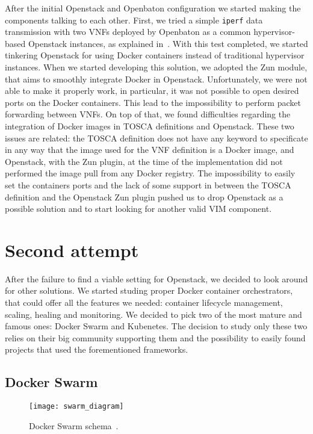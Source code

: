 After the initial Openstack and Openbaton configuration we started making the
components talking to each other. First, we tried a simple \verb!iperf! data
transmission with two VNFs deployed by Openbaton as a common hypervisor-based
Openstack instances, as explained in~\cite{openbatonIperf}. With this test
completed, we started tinkering Openstack for using Docker containers instead of
traditional hypervisor instances. When we started developing this solution, we
adopted the Zun module, that aims to smoothly integrate Docker in Openstack.
Unfortunately, we were not able to make it properly work, in particular, it was
not possible to open desired ports on the Docker containers. This lead to the
impossibility to perform packet forwarding between VNFs. On top of that, we
found difficulties regarding the integration of Docker images in TOSCA
definitions and Openstack. These two issues are related: the TOSCA definition
does not have any keyword to specificate in any way that the image used for the
VNF definition is a Docker image, and Openstack, with the Zun plugin, at the
time of the implementation did not performed the image pull from any Docker
registry. The impossibility to easily set the containers ports and the lack of
some support in between the TOSCA definition and the Openstack Zun plugin pushed
us to drop Openstack as a possible solution and to start looking for another
valid VIM component.

\section{Second attempt}

After the failure to find a viable setting for Openstack, we decided to look
around for other solutions. We started studing proper Docker container
orchestrators, that could offer all the features we needed: container lifecycle
management, scaling, healing and monitoring. We decided to pick two of the most
mature and famous ones: Docker Swarm and Kubenetes. The decision to study only
these two relies on their big community supporting them and the possibility to
easily found projects that used the forementioned frameworks.

\subsection{Docker Swarm}

\begin{figure}[t]
  \centering
  \texttt{[image: swarm\_diagram]}
  \caption[Docker Swarm schema]{Docker Swarm schema~\cite{dockerSwarmWiki}.}
  \label{chap:archimpl:sec:secondattempt:img:dockerswarm}
\end{figure}

